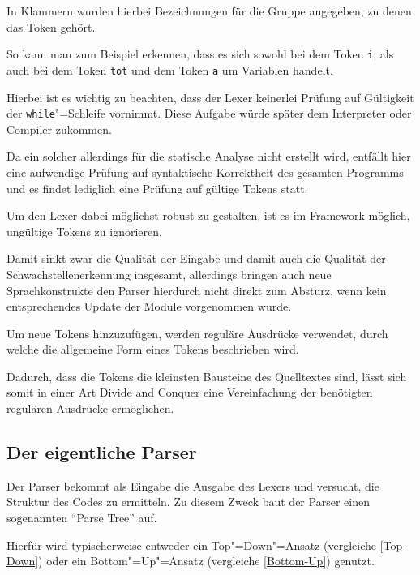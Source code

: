             In Klammern wurden hierbei Bezeichnungen für die Gruppe angegeben,
            zu denen das Token gehört.

            So kann man zum Beispiel erkennen,
            dass es sich sowohl bei dem Token
            \verb|i|,
            als auch bei dem Token
            \verb|tot| und
            dem Token
            \verb|a| um Variablen handelt.

            Hierbei ist es wichtig zu beachten,
            dass der Lexer keinerlei Prüfung auf Gültigkeit der
            \texttt{while}"=Schleife vornimmt.
            Diese Aufgabe würde
            später dem Interpreter oder
            Compiler zukommen.

            Da ein solcher allerdings für die statische Analyse nicht erstellt wird,
            entfällt hier eine aufwendige Prüfung auf syntaktische Korrektheit des gesamten Programms und
            es findet lediglich eine Prüfung auf gültige Tokens statt.

            Um den Lexer dabei möglichst robust zu gestalten,
            ist es im Framework möglich,
            ungültige Tokens zu ignorieren.

            Damit sinkt zwar die Qualität der Eingabe und
            damit auch die Qualität der Schwachstellenerkennung insgesamt,
            allerdings bringen auch neue Sprachkonstrukte den Parser hierdurch nicht direkt zum Absturz,
            wenn kein entsprechendes Update der Module vorgenommen wurde.

            Um neue Tokens hinzuzufügen,
            werden reguläre Ausdrücke verwendet,
            durch welche die allgemeine Form eines Tokens beschrieben wird.

            Dadurch,
            dass die Tokens die kleinsten Bausteine des Quelltextes sind,
            lässt sich somit in einer Art Divide and Conquer eine Vereinfachung der benötigten regulären Ausdrücke ermöglichen.

        \subsection{Der eigentliche Parser}
            Der Parser bekommt als Eingabe die Ausgabe des Lexers und
            versucht,
            die Struktur des Codes zu ermitteln.
            Zu diesem Zweck baut der Parser einen sogenannten
            \foreignquote{english}{Parse Tree} auf.

            Hierfür wird typischerweise entweder ein Top"=Down"=Ansatz
            (vergleiche
            \vref{Top-Down}) oder
            ein Bottom"=Up"=Ansatz
            (vergleiche
            \vref{Bottom-Up}) genutzt.

